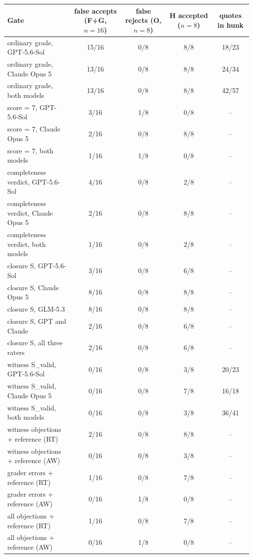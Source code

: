\begin{tabular}{@{}lcccc@{}}
\toprule
Gate & false accepts (F+G, $n{=}16$) & false rejects (O, $n{=}8$) & H accepted ($n{=}8$) & quotes in hunk \\
\midrule
ordinary grade, GPT-5.6-Sol & 15/16 & 0/8 & 8/8 & 18/23 \\
ordinary grade, Claude Opus 5 & 13/16 & 0/8 & 8/8 & 24/34 \\
ordinary grade, both models & 13/16 & 0/8 & 8/8 & 42/57 \\
\addlinespace[2pt]
score = 7, GPT-5.6-Sol & 3/16 & 1/8 & 0/8 & -- \\
score = 7, Claude Opus 5 & 2/16 & 0/8 & 8/8 & -- \\
score = 7, both models & 1/16 & 1/8 & 0/8 & -- \\
\addlinespace[2pt]
completeness verdict, GPT-5.6-Sol & 4/16 & 0/8 & 2/8 & -- \\
completeness verdict, Claude Opus 5 & 2/16 & 0/8 & 8/8 & -- \\
completeness verdict, both models & 1/16 & 0/8 & 2/8 & -- \\
\addlinespace[2pt]
closure S, GPT-5.6-Sol & 3/16 & 0/8 & 6/8 & -- \\
closure S, Claude Opus 5 & 8/16 & 0/8 & 8/8 & -- \\
closure S, GLM-5.3 & 8/16 & 0/8 & 8/8 & -- \\
closure S, GPT and Claude & 2/16 & 0/8 & 6/8 & -- \\
closure S, all three raters & 2/16 & 0/8 & 6/8 & -- \\
\addlinespace[2pt]
witness S\_valid, GPT-5.6-Sol & 0/16 & 0/8 & 3/8 & 20/23 \\
witness S\_valid, Claude Opus 5 & 0/16 & 0/8 & 7/8 & 16/18 \\
witness S\_valid, both models & 0/16 & 0/8 & 3/8 & 36/41 \\
\addlinespace[2pt]
witness objections + reference (RT) & 2/16 & 0/8 & 8/8 & -- \\
witness objections + reference (AW) & 0/16 & 0/8 & 3/8 & -- \\
grader errors + reference (RT) & 1/16 & 0/8 & 7/8 & -- \\
grader errors + reference (AW) & 0/16 & 1/8 & 0/8 & -- \\
all objections + reference (RT) & 1/16 & 0/8 & 7/8 & -- \\
all objections + reference (AW) & 0/16 & 1/8 & 0/8 & -- \\
\bottomrule
\end{tabular}
